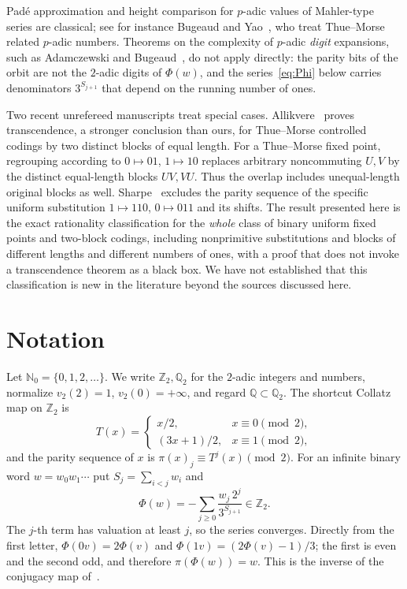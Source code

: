 \documentclass[11pt]{amsart}
\theoremstyle{remark}
\theoremstyle{definition}
\numberwithin{equation}{section}
\newcommand{\Q}{\mathbb{Q}}
\newcommand{\Z}{\mathbb{Z}}
\newcommand{\N}{\mathbb{N}}
\newcommand{\vt}{v_2}
\begin{document}
Pad\'e approximation and height comparison for $p$-adic values of Mahler-type series are classical; see for instance Bugeaud and Yao~\cite{BY2017}, who treat Thue--Morse related $p$-adic numbers. Theorems on the complexity of $p$-adic \emph{digit} expansions, such as Adamczewski and Bugeaud~\cite{AB2007}, do not apply directly: the parity bits of the orbit are not the $2$-adic digits of $\Phi(w)$, and the series~\eqref{eq:Phi} below carries denominators $3^{S_{j+1}}$ that depend on the running number of ones.

Two recent unrefereed manuscripts treat special cases. Allikvere~\cite{Allikvere2026} proves transcendence, a stronger conclusion than ours, for Thue--Morse controlled codings by two distinct blocks of equal length. For a Thue--Morse fixed point, regrouping according to $0\mapsto01$, $1\mapsto10$ replaces arbitrary noncommuting $U,V$ by the distinct equal-length blocks $UV,VU$. Thus the overlap includes unequal-length original blocks as well. Sharpe~\cite{Sharpe2026} excludes the parity sequence of the specific uniform substitution $1\mapsto110$, $0\mapsto011$ and its shifts. The result presented here is the exact rationality classification for the \emph{whole} class of binary uniform fixed points and two-block codings, including nonprimitive substitutions and blocks of different lengths and different numbers of ones, with a proof that does not invoke a transcendence theorem as a black box. We have not established that this classification is new in the literature beyond the sources discussed here.

\section{Notation}\label{sec:notation}

Let $\N_0=\{0,1,2,\dots\}$. We write $\Z_2,\Q_2$ for the $2$-adic integers and numbers, normalize $\vt(2)=1$, $\vt(0)=+\infty$, and regard $\Q\subset\Q_2$. The shortcut Collatz map on $\Z_2$ is
\[
T(x)=\begin{cases} x/2, & x\equiv0\pmod2,\\ (3x+1)/2, & x\equiv1\pmod2,\end{cases}
\]
and the parity sequence of $x$ is $\pi(x)_j\equiv T^j(x)\pmod 2$. For an infinite binary word $w=w_0w_1\cdots$ put $S_j=\sum_{i<j}w_i$ and
\begin{equation}\label{eq:Phi}
\Phi(w)=-\sum_{j\ge0}\frac{w_j\,2^j}{3^{S_{j+1}}}\in\Z_2 .
\end{equation}
The $j$-th term has valuation at least $j$, so the series converges. Directly from the first letter, $\Phi(0v)=2\Phi(v)$ and $\Phi(1v)=(2\Phi(v)-1)/3$; the first is even and the second odd, and therefore $\pi(\Phi(w))=w$. This is the inverse of the conjugacy map of~\cite{BL1996}.
\end{document}
